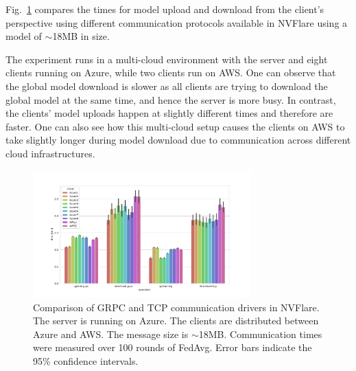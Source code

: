 \documentclass[11pt]{article}
\begin{document}
Fig.~\ref{fig:cloud_comm} compares the times for model upload and download from the client's perspective using different communication protocols available in NVFlare using a model of $\sim$18MB in size.

The experiment runs in a multi-cloud environment with the server and eight clients running on Azure, while two clients run on AWS. One can observe that the global model download is slower as all clients are trying to download the global model at the same time, and hence the server is more busy. In contrast, the clients' model uploads happen at slightly different times and therefore are faster. One can also see how this multi-cloud setup causes the clients on AWS to take slightly longer during model download due to communication across different cloud infrastructures. 

\begin{figure}[htbp]
    \centering
    \includegraphics[width=0.75\textwidth]{fig/comm_protocols1.pdf}
    \caption{Comparison of GRPC and TCP communication drivers in NVFlare. The server is running on Azure. The clients are distributed between Azure and AWS. The message size is $\sim$18MB. Communication times were measured over 100 rounds of FedAvg. Error bars indicate the 95\% confidence intervals. \label{fig:cloud_comm}}
\end{figure}
\end{document}
